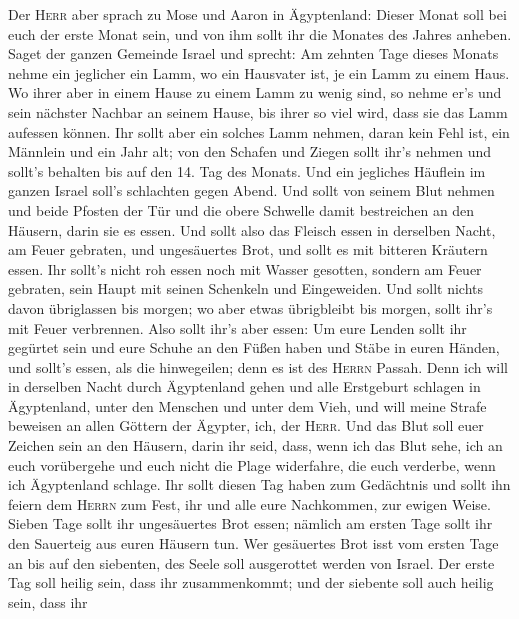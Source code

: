  Der \textsc{Herr} aber sprach zu Mose und Aaron in
Ägyptenland:  Dieser Monat soll bei euch der erste Monat
sein, und von ihm sollt ihr die Monates des Jahres anheben.
 Saget der ganzen Gemeinde Israel und sprecht: Am zehnten
Tage dieses Monats nehme ein jeglicher ein Lamm, wo ein Hausvater ist,
je ein Lamm zu einem Haus.  Wo ihrer aber in einem Hause
zu einem Lamm zu wenig sind, so nehme er's und sein nächster Nachbar an
seinem Hause, bis ihrer so viel wird, dass sie das Lamm aufessen können.
 Ihr sollt aber ein solches Lamm nehmen, daran kein Fehl
ist, ein Männlein und ein Jahr alt; von den Schafen und Ziegen sollt
ihr's nehmen  und sollt's behalten bis auf den 14. Tag des
Monats. Und ein jegliches Häuflein im ganzen Israel soll's schlachten
gegen Abend.  Und sollt von seinem Blut nehmen und beide
Pfosten der Tür und die obere Schwelle damit bestreichen an den Häusern,
darin sie es essen.  Und sollt also das Fleisch essen in
derselben Nacht, am Feuer gebraten, und ungesäuertes Brot, und sollt es
mit bitteren Kräutern essen.  Ihr sollt's nicht roh essen
noch mit Wasser gesotten, sondern am Feuer gebraten, sein Haupt mit
seinen Schenkeln und Eingeweiden.  Und sollt nichts davon
übriglassen bis morgen; wo aber etwas übrigbleibt bis morgen, sollt
ihr's mit Feuer verbrennen.  Also sollt ihr's aber essen:
Um eure Lenden sollt ihr gegürtet sein und eure Schuhe an den Füßen
haben und Stäbe in euren Händen, und sollt's essen, als die hinwegeilen;
denn es ist des \textsc{Herrn} Passah.  Denn ich will in
derselben Nacht durch Ägyptenland gehen und alle Erstgeburt schlagen in
Ägyptenland, unter den Menschen und unter dem Vieh, und will meine
Strafe beweisen an allen Göttern der Ägypter, ich, der \textsc{Herr}.
 Und das Blut soll euer Zeichen sein an den Häusern,
darin ihr seid, dass, wenn ich das Blut sehe, ich an euch vorübergehe
und euch nicht die Plage widerfahre, die euch verderbe, wenn ich
Ägyptenland schlage.  Ihr sollt diesen Tag haben zum
Gedächtnis und sollt ihn feiern dem \textsc{Herrn} zum Fest, ihr und
alle eure Nachkommen, zur ewigen Weise.  Sieben Tage
sollt ihr ungesäuertes Brot essen; nämlich am ersten Tage sollt ihr den
Sauerteig aus euren Häusern tun. Wer gesäuertes Brot isst vom ersten
Tage an bis auf den siebenten, des Seele soll ausgerottet werden von
Israel.  Der erste Tag soll heilig sein, dass ihr
zusammenkommt; und der siebente soll auch heilig sein, dass ihr
